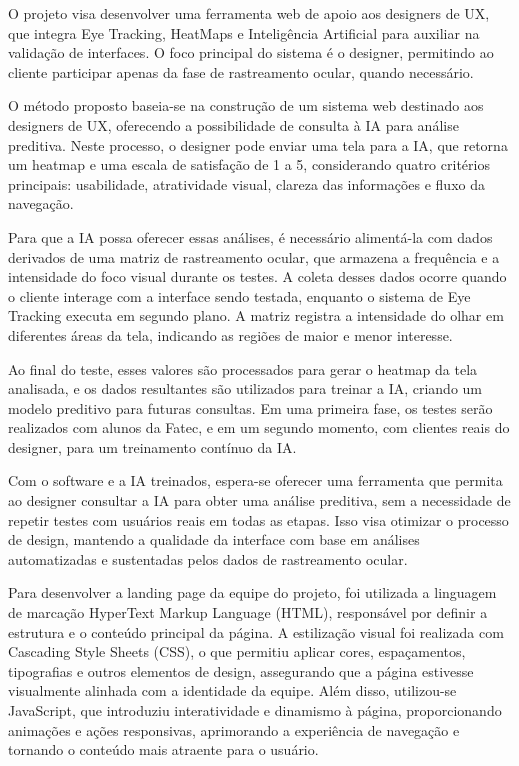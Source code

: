 O projeto visa desenvolver uma ferramenta web de apoio aos designers de UX, que integra Eye Tracking, HeatMaps e Inteligência Artificial para auxiliar na validação de interfaces. O foco principal do sistema é o designer, permitindo ao cliente participar apenas da fase de rastreamento ocular, quando necessário.

O método proposto baseia-se na construção de um sistema web destinado aos designers de UX, oferecendo a possibilidade de consulta à IA para análise preditiva. Neste processo, o designer pode enviar uma tela para a IA, que retorna um heatmap e uma escala de satisfação de 1 a 5, considerando quatro critérios principais: usabilidade, atratividade visual, clareza das informações e fluxo da navegação.

Para que a IA possa oferecer essas análises, é necessário alimentá-la com dados derivados de uma matriz de rastreamento ocular, que armazena a frequência e a intensidade do foco visual durante os testes. A coleta desses dados ocorre quando o cliente interage com a interface sendo testada, enquanto o sistema de Eye Tracking executa em segundo plano. A matriz registra a intensidade do olhar em diferentes áreas da tela, indicando as regiões de maior e menor interesse.

Ao final do teste, esses valores são processados para gerar o heatmap da tela analisada, e os dados resultantes são utilizados para treinar a IA, criando um modelo preditivo para futuras consultas. Em uma primeira fase, os testes serão realizados com alunos da Fatec, e em um segundo momento, com clientes reais do designer, para um treinamento contínuo da IA.

Com o software e a IA treinados, espera-se oferecer uma ferramenta que permita ao designer consultar a IA para obter uma análise preditiva, sem a necessidade de repetir testes com usuários reais em todas as etapas. Isso visa otimizar o processo de design, mantendo a qualidade da interface com base em análises automatizadas e sustentadas pelos dados de rastreamento ocular.

Para desenvolver a landing page da equipe do projeto, foi utilizada a linguagem de marcação HyperText Markup Language (HTML), responsável por definir a estrutura e o conteúdo principal da página. A estilização visual foi realizada com Cascading Style Sheets (CSS), o que permitiu aplicar cores, espaçamentos, tipografias e outros elementos de design, assegurando que a página estivesse visualmente alinhada com a identidade da equipe. Além disso, utilizou-se JavaScript, que introduziu interatividade e dinamismo à página, proporcionando animações e ações responsivas, aprimorando a experiência de navegação e tornando o conteúdo mais atraente para o usuário.

